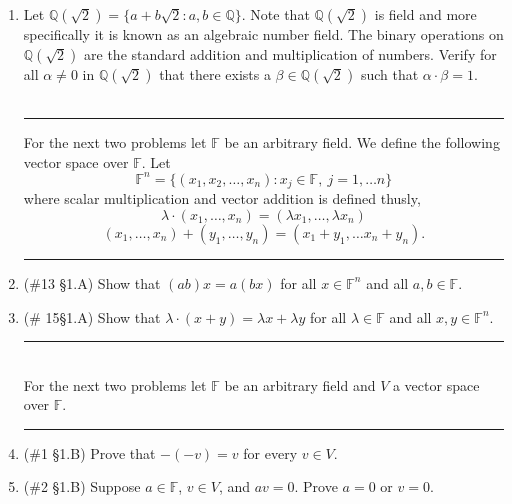 \documentclass[12pt,letterpaper]{article}
\newcommand{\qq}{\mathbb Q}   %
\theoremstyle{plain}
\theoremstyle{definition}
\begin{document}
\begin{enumerate}[1.]
 \item Let $\qq(\sqrt{2})=\{a+b\sqrt{2} : a,b\in \mathbb{Q}\}$.  Note that $\qq(\sqrt{2})$ is field and more specifically it is known as an algebraic number field. The binary operations on $\qq(\sqrt{2})$ are the standard addition and multiplication of numbers. Verify for all $\alpha\neq 0$ in $\qq(\sqrt{2})$ that there exists a $\beta\in \qq(\sqrt{2})$ such that $\alpha \cdot \beta = 1$. \\
 \ \\
 \hrule
 For the next two problems let $\mathbb{F}$ be an arbitrary field. We define the following vector space over $\mathbb{F}$. Let
\[\mathbb{F}^n=\{(x_1,x_2,\ldots, x_n) : x_j\in \mathbb{F},\ j=1, \ldots n\}\] where scalar multiplication and vector addition is defined thusly, 
\[\lambda \cdot (x_1, \ldots , x_n)=(\lambda x_1, \ldots , \lambda x_n)\]
\[(x_1,\ldots ,x_n)+(y_1,\ldots ,y_n)=(x_1+y_1, \ldots x_n+y_n).\]
\hrule

\item (\#13 \S 1.A) Show that $(ab)x=a(bx)$ for all $x\in \mathbb{F}^n$ and all $a,b\in \mathbb{F}$. \\
\item (\# 15\S 1.A) Show that $\lambda \cdot (x+y)=\lambda x+\lambda y$ for all $\lambda \in \mathbb{F}$ and all $x,y\in \mathbb{F}^n$. \\
\hrule 
\ \\
For the next two problems let $\mathbb{F}$ be an arbitrary field and $V$ a vector space over $\mathbb{F}$.
\ \\
\hrule 
\item (\#1 \S 1.B) Prove that $-(-v)=v$ for every $v\in V$. 
\item (\#2 \S 1.B) Suppose $a\in \mathbb{F}$, $v\in V$, and $av=0$. Prove $a=0$ or $v=0$. 
\end{enumerate}
\end{document}
